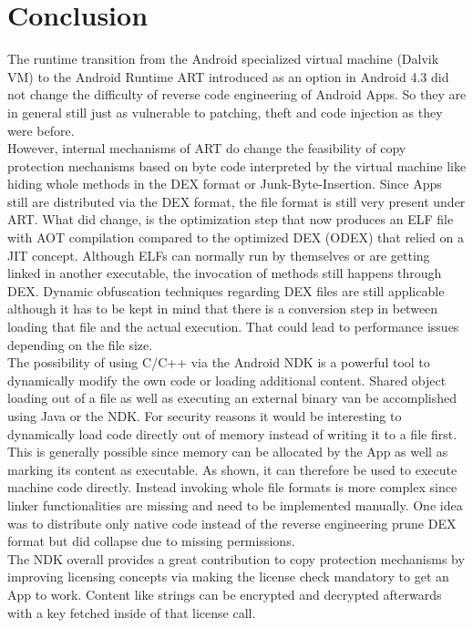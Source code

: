\chapter{Conclusion}\label{chapter:conclusion}
The runtime transition from the Android specialized virtual machine (Dalvik VM)
to the Android Runtime ART introduced as an option in Android 4.3 did not change the difficulty of reverse code engineering of Android Apps. So they are in general still just as vulnerable to patching, theft and code injection as they were before.\\

However, internal mechanisms of ART do change the feasibility of copy protection
mechanisms based on byte code interpreted by the virtual machine like hiding
whole methods in the DEX format or Junk-Byte-Insertion.
Since Apps still are distributed via the DEX
format, the file format is still very present under ART.
What did change, is the optimization
step that now produces an ELF file with AOT compilation compared to the optimized
DEX (ODEX) that relied on a JIT concept. Although ELFs can normally run by
themselves or are getting linked in another executable, the invocation of methods still happens through DEX.
Dynamic obfuscation techniques regarding DEX files are still applicable although
it has to be kept in mind that there is a conversion step in between loading that
file and the actual execution. That could lead to performance issues depending
on the file size.\\

The possibility of using C/C++ via the Android NDK is a
powerful tool to dynamically modify the own code or loading additional
content. Shared object loading out of a file as well as executing an external binary van be accomplished using Java or the NDK. For security reasons it
would be interesting to dynamically load code directly out of memory instead
of writing it to a file first. This is generally possible since memory can be allocated by the App as well as marking its content as executable.
As shown, it can therefore be used to execute machine code directly. Instead invoking
whole file formats is more complex since linker functionalities are missing
and need to be implemented manually. One idea was to distribute only native code instead of the reverse engineering prune DEX format
but did collapse due to missing permissions.\\

The NDK overall provides a great contribution to copy protection mechanisms
by improving licensing concepts via making the license check mandatory to get
an App to work. Content like strings can be
encrypted and decrypted afterwards with a key fetched inside of that
license call.\\

